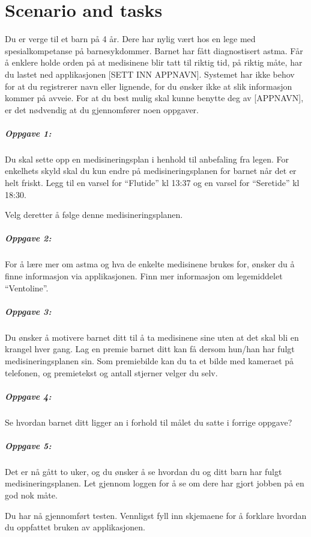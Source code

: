 \chapter{Scenario and tasks}
\label{app:scenarioandtasks}


Du er verge til et barn på 4 år. Dere har nylig vært hos en lege med spesialkompetanse på barnesykdommer.
Barnet har fått diagnostisert astma. Får å enklere holde orden på at medisinene blir tatt til riktig tid, på riktig måte, 
har du lastet ned applikasjonen [SETT INN APPNAVN]. Systemet har ikke behov for at du registrerer navn eller lignende, 
for du ønsker ikke at slik informasjon kommer på avveie. For at du best mulig skal kunne benytte deg av [APPNAVN], er det
nødvendig at du gjennomfører noen oppgaver.

\paragraph{Oppgave 1:}
Du skal sette opp en medisineringsplan i henhold til anbefaling fra legen. For enkelhets skyld skal du kun endre på
medisineringsplanen for barnet når det er helt friskt. Legg til en varsel for ``Flutide'' kl 13:37 og en varsel for ``Seretide'' kl 18:30.

Velg deretter å følge denne medisineringsplanen.


\paragraph{Oppgave 2:}
For å lære mer om astma og hva de enkelte medisinene brukes for, ønsker du å finne informasjon via applikasjonen. 
Finn mer informasjon om legemiddelet ``Ventoline''.


\paragraph{Oppgave 3:}
Du ønsker å motivere barnet ditt til å ta medisinene sine uten at det skal bli en krangel hver gang.
Lag en premie barnet ditt kan få dersom hun/han har fulgt medisineringsplanen sin.
Som premiebilde kan du ta et bilde med kameraet på telefonen, og premietekst og antall stjerner velger du selv.


\paragraph{Oppgave 4:}
Se hvordan barnet ditt ligger an i forhold til målet du satte i forrige oppgave?


\paragraph{Oppgave 5:}
Det er nå gått to uker, og du ønsker å se hvordan du og ditt barn har fulgt medisineringsplanen. 
Let gjennom loggen for å se om dere har gjort jobben på en god nok måte.



Du har nå gjennomført testen. Vennligst fyll inn skjemaene for å forklare hvordan du oppfattet bruken av applikasjonen.